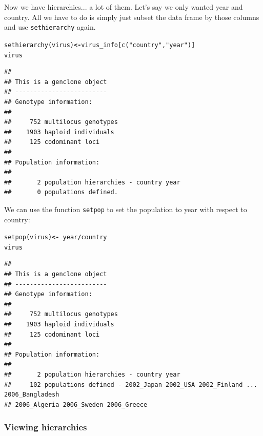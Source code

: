 \documentclass[letterpaper]{article}\usepackage[]{graphicx}\usepackage[]{color}
\makeatletter
\newcommand{\hlstr}[1]{\textcolor[rgb]{0.651,0.522,0}{#1}}%
\newcommand{\hlopt}[1]{\textcolor[rgb]{1,0,0.502}{\textbf{#1}}}%
\newcommand{\hlstd}[1]{\textcolor[rgb]{0,0,0}{#1}}%
\newcommand{\hlkwb}[1]{\textcolor[rgb]{0.502,0.502,0.753}{\textbf{#1}}}%
\newcommand{\hlkwd}[1]{\textcolor[rgb]{0,0.267,0.4}{#1}}%
\newenvironment{kframe}{%
 \def\at@end@of@kframe{}%
 \ifinner\ifhmode%
  \def\at@end@of@kframe{\end{minipage}}%
  \begin{minipage}{\columnwidth}%
 \fi\fi%
 \def\FrameCommand##1{\hskip\@totalleftmargin \hskip-\fboxsep
 \colorbox{shadecolor}{##1}\hskip-\fboxsep
     \hskip-\linewidth \hskip-\@totalleftmargin \hskip\columnwidth}%
 \MakeFramed {\advance\hsize-\width
   \@totalleftmargin\z@ \linewidth\hsize
   \@setminipage}}%
 {\par\unskip\endMakeFramed%
 \at@end@of@kframe}
\newenvironment{knitrout}{}{} %
\makeatother
\begin{document}
\noindent
Now we have hierarchies... a lot of them. Let's say we only wanted year and
country. All we have to do is simply just subset the data frame by those columns
and use \texttt{sethierarchy} again.

\begin{knitrout}\footnotesize
{}\color{fgcolor}\begin{kframe}
\begin{alltt}
\hlkwd{sethierarchy}\hlstd{(virus)} \hlkwb{<-} \hlstd{virus_info[}\hlkwd{c}\hlstd{(}\hlstr{"country"}\hlstd{,} \hlstr{"year"}\hlstd{)]}
\hlstd{virus}
\end{alltt}
\begin{verbatim}
## 
## This is a genclone object
## -------------------------
## Genotype information:
## 
##     752 multilocus genotypes
##    1903 haploid individuals
##     125 codominant loci
## 
## Population information:
## 
##       2 population hierarchies - country year
##       0 populations defined.
\end{verbatim}
\end{kframe}
\end{knitrout}

\noindent
We can use the function \texttt{setpop} to set the population to year with
respect to country:

\begin{knitrout}\footnotesize
{}\color{fgcolor}\begin{kframe}
\begin{alltt}
\hlkwd{setpop}\hlstd{(virus)} \hlkwb{<-} \hlopt{~}\hlstd{year}\hlopt{/}\hlstd{country}
\hlstd{virus}
\end{alltt}
\begin{verbatim}
## 
## This is a genclone object
## -------------------------
## Genotype information:
## 
##     752 multilocus genotypes
##    1903 haploid individuals
##     125 codominant loci
## 
## Population information:
## 
##       2 population hierarchies - country year
##     102 populations defined - 2002_Japan 2002_USA 2002_Finland ... 2006_Bangladesh 
## 2006_Algeria 2006_Sweden 2006_Greece
\end{verbatim}
\end{kframe}
\end{knitrout}


\subsubsection{Viewing hierarchies}\label{data.manip:hier:view}
\end{document}

